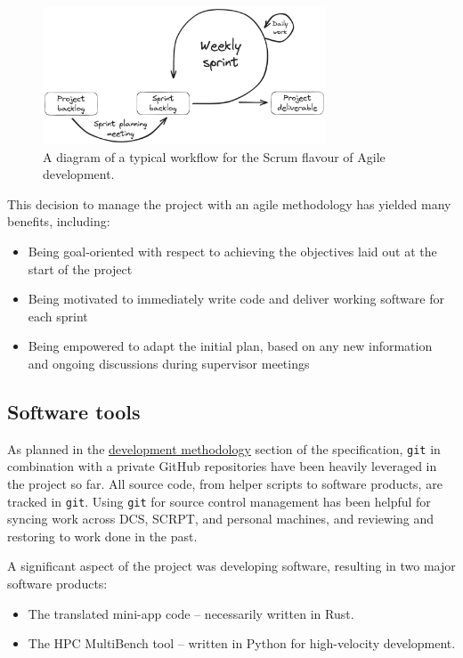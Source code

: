 \begin{figure}[h]
    \centering
    \includegraphics[width=0.75\textwidth]{images/6_project_management/excalidraw_agile.png}
    \caption{A diagram of a typical workflow for the Scrum flavour of Agile development.}
    \label{fig:excalidraw_agile}
\end{figure}

This decision to manage the project with an agile methodology has yielded many benefits, including:

\begin{itemize}
    \item Being goal-oriented with respect to achieving the objectives laid out at the start of the project
    \item Being motivated to immediately write code and deliver working software for each sprint
    \item Being empowered to adapt the initial plan, based on any new information and ongoing discussions during supervisor meetings
\end{itemize}

\subsection{Software tools}
\label{ssec:software-tools}

As planned in the \hyperref[sec:development_methodology]{development methodology} section of the specification, \texttt{git} in combination with a private GitHub repositories have been heavily leveraged in the project so far. All source code, from helper scripts to software products, are tracked in \texttt{git}. Using \texttt{git} for source control management has been helpful for syncing work across DCS, SCRPT, and personal machines, and reviewing and restoring to work done in the past.

A significant aspect of the project was developing software, resulting in two major software products:

\begin{itemize}
    \item The translated mini-app code -- necessarily written in Rust.
    \item The HPC MultiBench tool -- written in Python for high-velocity development.
\end{itemize}

